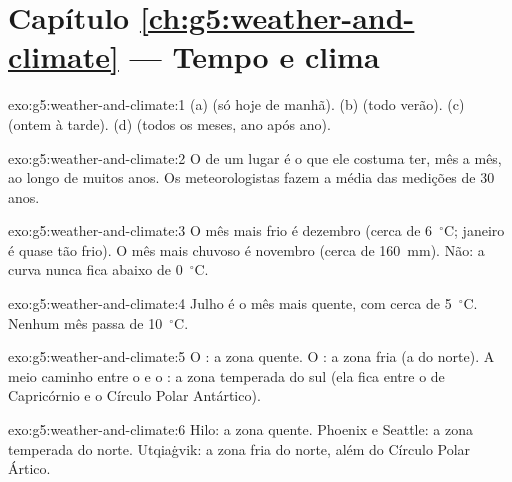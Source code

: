 \section*{Capítulo \ref{ch:g5:weather-and-climate} --- Tempo e clima}

\begin{solution}{exo:g5:weather-and-climate:1}
(a)  (só hoje de manhã). (b)  (todo verão). (c)  (ontem à
tarde). (d)  (todos os meses, ano após ano).
\end{solution}

\begin{solution}{exo:g5:weather-and-climate:2}
O  de um lugar é o  que ele costuma ter, mês a mês, ao longo de
muitos anos. Os meteorologistas fazem a média das medições de 30 anos.
\end{solution}

\begin{solution}{exo:g5:weather-and-climate:3}
O mês mais frio é dezembro (cerca de 6~$^\circ$C; janeiro é quase tão
frio). O mês mais chuvoso é novembro (cerca de 160~mm). Não: a curva nunca
fica abaixo de 0~$^\circ$C.
\end{solution}

\begin{solution}{exo:g5:weather-and-climate:4}
Julho é o mês mais quente, com cerca de 5~$^\circ$C. Nenhum mês passa de
10~$^\circ$C.
\end{solution}

\begin{solution}{exo:g5:weather-and-climate:5}
O : a zona quente. O : a zona fria (a do norte). A meio
caminho entre o  e o : a zona temperada do sul (ela fica
entre o  de Capricórnio e o Círculo Polar Antártico).
\end{solution}

\begin{solution}{exo:g5:weather-and-climate:6}
Hilo: a zona quente. Phoenix e Seattle: a zona temperada do norte.
Utqiaġvik: a zona fria do norte, além do Círculo Polar Ártico.
\end{solution}

